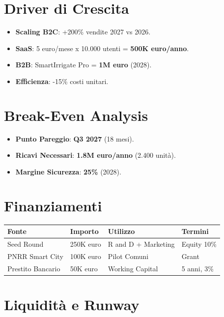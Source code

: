 \documentclass[11pt,a4paper]{report}
\begin{document}
\section{Driver di Crescita}
\begin{itemize}
\item {\bf Scaling B2C}: +200\% vendite 2027 vs 2026.
\item {\bf SaaS}: 5 euro/mese x 10.000 utenti = {\bf 500K euro/anno}.
\item {\bf B2B}: SmartIrrigate Pro = {\bf 1M euro} (2028).
\item {\bf Efficienza}: -15\% costi unitari.
\end{itemize}

\section{Break-Even Analysis}
\begin{itemize}
\item {\bf Punto Pareggio}: {\bf Q3 2027} (18 mesi).
\item {\bf Ricavi Necessari}: {\bf 1.8M euro/anno} (2.400 unità).
\item {\bf Margine Sicurezza}: {\bf 25\%} (2028).
\end{itemize}

\section{Finanziamenti}
\begin{longtable}{|L{2.5cm}|C{1.5cm}|L{3cm}|L{2cm}|}
\hline
{\bf Fonte} & {\bf Importo} & {\bf Utilizzo} & {\bf Termini} \\ \hline
Seed Round & 250K euro & R and D + Marketing & Equity 10\% \\
PNRR Smart City & 100K euro & Pilot Comuni & Grant \\
Prestito Bancario & 50K euro & Working Capital & 5 anni, 3\% \\ \hline
\end{longtable}

\section{Liquidità e Runway}
\end{document}
